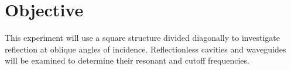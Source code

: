 \section{Objective}\label{sec:objective}
This experiment will use a square structure divided diagonally to investigate reflection at oblique angles of incidence.
Reflectionless cavities and waveguides will be examined to determine their resonant and cutoff frequencies.


